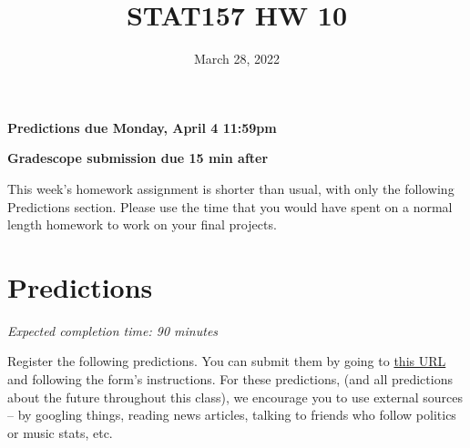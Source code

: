 \documentclass[11pt]{article}
\title{STAT157 HW 10}
\date{March 28, 2022}
\begin{document}
\maketitle

\hfill \textbf{Predictions due Monday, April 4 11:59pm}

\hfill \textbf{Gradescope submission due 15 min after}


This week's homework assignment is shorter than usual, with only the following Predictions section. Please use the time that you would have spent on a normal length homework to work on your final projects.


\section*{Predictions}

\emph{Expected completion time: 90 minutes}

Register the following predictions. You can submit them by going to \href{https://docs.google.com/forms/d/e/1FAIpQLSeAvSCrPasO4gNeqa_SrJIrslxGWjF-MRO8UQvhh9Gx3-JA_A/viewform?usp=sf_link}{this URL} and following the form's instructions. For these predictions, (and all predictions about the future throughout this class), we encourage you to use external sources -- by googling things, reading news articles, talking to friends who follow politics or music stats, etc.
\end{document}
